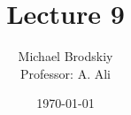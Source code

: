 


\title{Lecture 9}
\date{\today}
\author{Michael Brodskiy\\ \small Professor: A. Ali}



\maketitle


